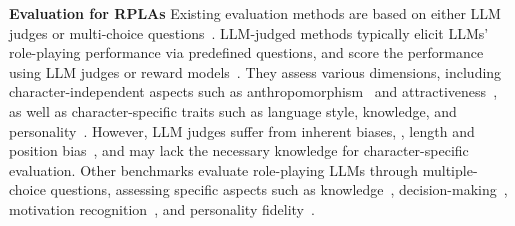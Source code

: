 \textbf{Evaluation for RPLAs} \quad
Existing evaluation methods are based on either LLM judges or multi-choice questions~\citep{chen2024from}. 
LLM-judged methods typically elicit LLMs’ role-playing performance via predefined questions, and score the performance using LLM judges or reward models~\citep{chen2024from}.
They assess various dimensions, including character-independent aspects such as anthropomorphism~\citep{tu2024charactereval} and attractiveness~\citep{zhou2023characterglm}, as well as character-specific traits such as language style, knowledge, and personality~\citep{wang2023rolellm, shao2023character}. 
However, LLM judges suffer from inherent biases, \eg, length and position bias~\citep{li2024judgesurvey}, and may lack the necessary knowledge for character-specific evaluation.
Other benchmarks evaluate role-playing LLMs through multiple-choice questions, assessing specific aspects such as knowledge~\citep{shen2023roleeval}, decision-making~\citep{xu2024character}, motivation recognition~\citep{yuan2024evaluating}, and personality fidelity~\citep{wang2024incharacter}.
